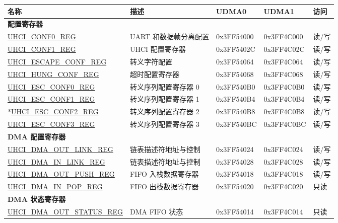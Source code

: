 \begin{longtable}{ | p{7cm} | p{4cm} | p{1.8cm} | p{1.8cm} | p{0.8cm} | }
\hline\rowcolor{lightgray}
名称 & 描述 & UDMA0 & UDMA1 & 访问 \\ \hline
\multicolumn{5}{|l|}{\textbf{配置寄存器}} \\ \hline
\hyperref[regdesc:UHCICONF0REG]{UHCI\_CONF0\_REG} &  UART 和数据帧分离配置 & {0x3FF54000} & {0x3FF4C000} & {读/写} \\ \hline
\hyperref[regdesc:UHCICONF1REG]{UHCI\_CONF1\_REG} & UHCI 配置寄存器 & 0x3FF5402C & 0x3FF4C02C & 读/写 \\ \hline
\hyperref[regdesc:UHCIESCAPECONFREG]{UHCI\_ESCAPE\_CONF\_REG} & 转义字符配置 & {0x3FF54064} & {0x3FF4C064} & {读/写} \\ \hline
\hyperref[regdesc:UHCIHUNGCONFREG]{UHCI\_HUNG\_CONF\_REG} & 超时配置寄存器 & 0x3FF54068 & 0x3FF4C068 & 读/写 \\ \hline
\hyperref[regdesc:UHCIESCCONFnREG]{UHCI\_ESC\_CONF0\_REG} & 转义序列配置寄存器 0 & {0x3FF540B0} & {0x3FF4C0B0} & {读/写} \\ \hline
{\hyperref[regdesc:UHCIESCCONFnREG]{UHCI\_ESC\_CONF1\_REG}} & 转义序列配置寄存器 1 & {0x3FF540B4} & {0x3FF4C0B4} & {读/写} \\ \hline
*{\hyperref[regdesc:UHCIESCCONFnREG]{UHCI\_ESC\_CONF2\_REG}} & 转义序列配置寄存器 2 & {0x3FF540B8} & {0x3FF4C0B8} & {读/写} \\ \hline
{\hyperref[regdesc:UHCIESCCONFnREG]{UHCI\_ESC\_CONF3\_REG}} & 转义序列配置寄存器 3 & {0x3FF540BC} & {0x3FF4C0BC} & {读/写} \\ \hline
\multicolumn{5}{|l|}{\textbf{DMA 配置寄存器}} \\ \hline
\hyperref[regdesc:UHCIDMAOUTLINKREG]{UHCI\_DMA\_OUT\_LINK\_REG} & 链表描述符地址与控制 & {0x3FF54024} & {0x3FF4C024} & {读/写} \\ \hline
\hyperref[regdesc:UHCIDMAINLINKREG]{UHCI\_DMA\_IN\_LINK\_REG} & 链表描述符地址与控制 & {0x3FF54028} & {0x3FF4C028} & {读/写} \\ \hline
\hyperref[regdesc:UHCIDMAOUTPUSHREG]{UHCI\_DMA\_OUT\_PUSH\_REG} & FIFO 入栈数据寄存器 & 0x3FF54018 & 0x3FF4C018 & 读/写 \\ \hline
\hyperref[regdesc:UHCIDMAINPOPREG]{UHCI\_DMA\_IN\_POP\_REG} & FIFO 出栈数据寄存器 & 0x3FF54020 & 0x3FF4C020 & 只读 \\ \hline
\multicolumn{5}{|l|}{\textbf{DMA 状态寄存器}} \\ \hline
\hyperref[regdesc:UHCIDMAOUTSTATUSREG]{UHCI\_DMA\_OUT\_STATUS\_REG} & DMA FIFO 状态 & 0x3FF54014 & 0x3FF4C014 & 只读 \\ \hline

\end{longtable}

